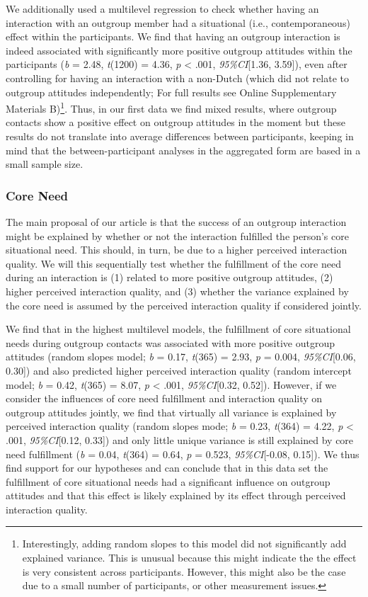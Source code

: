We additionally used a multilevel regression to check whether having an
interaction with an outgroup member had a situational (i.e.,
contemporaneous) effect within the participants. We find that having an
outgroup interaction is indeed associated with significantly more
positive outgroup attitudes within the participants (\textit{b} = 2.48,
\textit{t}(1200) = 4.36, \textit{p} \textless{} .001,
\textit{95\%CI}{[}1.36, 3.59{]}), even after controlling for having an
interaction with a non-Dutch (which did not relate to outgroup attitudes
independently; For full results see Online Supplementary Materials
B)\footnote{Interestingly, adding random slopes to this model did not significantly add explained variance. This is unusual because this might indicate the the effect is very consistent across participants. However, this might also be the case due to a small number of participants, or other measurement issues.}.
Thus, in our first data we find mixed results, where outgroup contacts
show a positive effect on outgroup attitudes in the moment but these
results do not translate into average differences between participants,
keeping in mind that the between-participant analyses in the aggregated
form are based in a small sample size.

\subsubsection{Core Need}

The main proposal of our article is that the success of an outgroup
interaction might be explained by whether or not the interaction
fulfilled the person's core situational need. This should, in turn, be
due to a higher perceived interaction quality. We will this sequentially
test whether the fulfillment of the core need during an interaction is
(1) related to more positive outgroup attitudes, (2) higher perceived
interaction quality, and (3) whether the variance explained by the core
need is assumed by the perceived interaction quality if considered
jointly.

We find that in the highest multilevel models, the fulfillment of core
situational needs during outgroup contacts was associated with more
positive outgroup attitudes (random slopes model; \textit{b} = 0.17,
\textit{t}(365) = 2.93, \textit{p} = 0.004, \textit{95\%CI}{[}0.06,
0.30{]}) and also predicted higher perceived interaction quality (random
intercept model; \textit{b} = 0.42, \textit{t}(365) = 8.07, \textit{p}
\textless{} .001, \textit{95\%CI}{[}0.32, 0.52{]}). However, if we
consider the influences of core need fulfillment and interaction quality
on outgroup attitudes jointly, we find that virtually all variance is
explained by perceived interaction quality (random slopes mode;
\textit{b} = 0.23, \textit{t}(364) = 4.22, \textit{p} \textless{} .001,
\textit{95\%CI}{[}0.12, 0.33{]}) and only little unique variance is
still explained by core need fulfillment (\textit{b} = 0.04,
\textit{t}(364) = 0.64, \textit{p} = 0.523, \textit{95\%CI}{[}-0.08,
0.15{]}). We thus find support for our hypotheses and can conclude that
in this data set the fulfillment of core situational needs had a
significant influence on outgroup attitudes and that this effect is
likely explained by its effect through perceived interaction quality.

